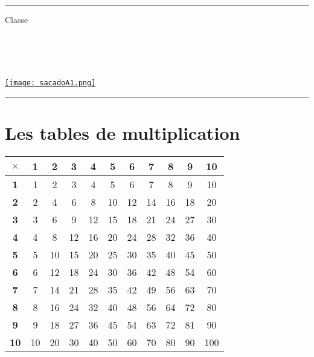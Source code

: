 \documentclass[a4paper,dvipsnames]{article}
\begin{document}

\fancyhead[C]{}
\hrule\medskip %
\begin{minipage}{0.295\textwidth} 
\raggedright
Classe \myClasse \hfill\\
\myDiscipline \hfill\\
\myParcours \hfill\\
\end{minipage}
\begin{minipage}{0.4\textwidth} 
\centering 
\scshape\huge
\textcolor{sacado_purple}{\myTitle} \\ 
\normalsize 
\end{minipage}
\begin{minipage}{0.295\textwidth} 
\raggedleft
\href{https://sacado.xyz/}{\texttt{[image: sacadoA1.png]}}
\end{minipage}
\medskip \hrule
\bigskip




\section{Les tables de multiplication}

\begin{center}
\begin{tabular}{c||c|c|c|c|c|c|c|c|c|c}
\textbf{$\times$} & \textbf{1} & \textbf{2} & \textbf{3} & \textbf{4} & \textbf{5} & \textbf{6} & \textbf{7} & \textbf{8} & \textbf{9} & \textbf{10} \\\hline\hline
\textbf{1} & 1 & 2 & 3 & 4 & 5 & 6 & 7 & 8 & 9 & 10 \\\hline
\textbf{2} & 2 & 4 & 6 & 8 & 10 & 12 & 14 & 16 & 18 & 20 \\\hline
\textbf{3} & 3 & 6 & 9 & 12 & 15 & 18 & 21 & 24 & 27 & 30 \\\hline
\textbf{4} & 4 & 8 & 12 & 16 & 20 & 24 & 28 & 32 & 36 & 40 \\\hline
\textbf{5} & 5 & 10 & 15 & 20 & 25 & 30 & 35 & 40 & 45 & 50 \\\hline
\textbf{6} & 6 & 12 & 18 & 24 & 30 & 36 & 42 & 48 & 54 & 60 \\\hline
\textbf{7} & 7 & 14 & 21 & 28 & 35 & 42 & 49 & 56 & 63 & 70 \\\hline
\textbf{8} & 8 & 16 & 24 & 32 & 40 & 48 & 56 & 64 & 72 & 80 \\\hline
\textbf{9} & 9 & 18 & 27 & 36 & 45 & 54 & 63 & 72 & 81 & 90 \\\hline
\textbf{10} & 10 & 20 & 30 & 40 & 50 & 60 & 70 & 80 & 90 & 100 \\
\end{tabular}
\end{center}
\end{document}
